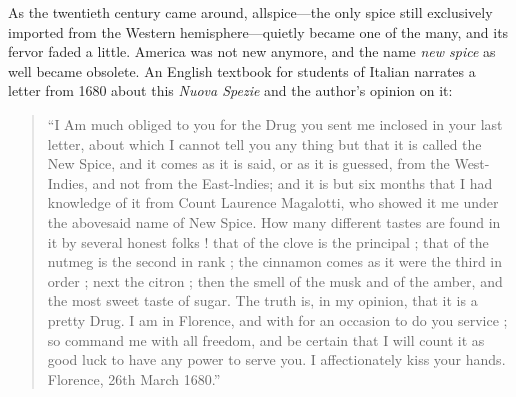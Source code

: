 As the twentieth century came around, allspice---the only spice still exclusively imported from the Western hemisphere---quietly became one of the many, and its fervor faded a little. America was not new anymore, and the name \textit{new spice} as well became obsolete. An English textbook for students of Italian narrates a letter from 1680 about this \textit{Nuova Spezie} and the author's opinion on it:

\begin{quote}
``I Am much obliged to you for the Drug you sent me inclosed in your last letter, about which I cannot tell you any thing but that it is called the New Spice, and it comes as it is said, or as it is guessed, from the West-Indies, and not from the East-lndies; and it is but six months that I had knowledge of it from Count Laurence Magalotti, who showed it me under the abovesaid name of New Spice. How many different tastes are found in it by several honest folks ! that of the clove is the principal ; that of the nutmeg is the second in rank ; the cinnamon comes as it were the third in order ; next the citron ; then the smell of the musk and of the amber, and the most sweet taste of sugar. The truth is, in my opinion, that it is a pretty Drug. I am in Florence, and with for an occasion to do you service ; so command me with all freedom, and be certain that I will count it as good luck to have any power to serve you. I affectionately kiss your hands. Florence, 26th March 1680.'' \autocite[5]{baretti_introduction_1755}
\end{quote}


